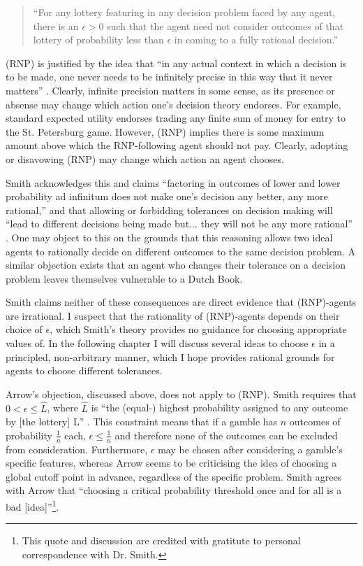 \documentclass{article}
\begin{document}
\begin{quote}
``For any lottery featuring in any decision problem faced by any agent, there is an \(\epsilon > 0\) such that the agent need not consider outcomes of that lottery of probability less than \(\epsilon\) in coming to a fully rational decision.''
\end{quote}

(RNP) is justified by the idea that ``in any actual context in which a decision is to be made, one never needs to be infinitely precise in this way \textemdash{} that it never matters'' \citep[pg. 474]{smith2014evaluative}. Clearly, infinite precision matters in some sense, as its presence or absense may change which action one's decision theory endorses. For example, standard expected utility endorses trading any finite sum of money for entry to the St. Petersburg game. However, (RNP) implies there is some maximum amount above which the RNP-following agent should not pay. Clearly, adopting or disavowing (RNP) may change which action an agent chooses.

Smith acknowledges this and claims ``factoring in outcomes of lower and lower probability ad infinitum does not make one’s decision any better, any more rational,'' and that allowing or forbidding tolerances on decision making will ``lead to different decisions being made \textemdash{} but... they will not be any more rational'' \citep[pg. 475]{smith2014evaluative}. One may object to this on the grounds that this reasoning allows two ideal agents to rationally decide on different outcomes to the same decision problem. A similar objection exists that an agent who changes their tolerance on a decision problem leaves themselves vulnerable to a Dutch Book. 

Smith claims neither of these consequences are direct evidence that (RNP)-agents are irrational. I suspect that the rationality of (RNP)-agents depends on their choice of \(\epsilon\), which Smith's theory provides no guidance for choosing appropriate values of. In the following chapter I will discuss several ideas to choose \(\epsilon\) in a principled, non-arbitrary manner, which I hope provides rational grounds for agents to choose different tolerances. 

Arrow's objection, discussed above, does not apply to (RNP). Smith requires that \(0 < \epsilon \leq \hat{L}\), where \(\hat{L}\) is ``the (equal-) highest probability assigned to any outcome by [the lottery] L'' \citep[pg. 479]{smith2014evaluative}. This constraint means that if a gamble has \(n\) outcomes of probability \(\frac{1}{n}\) each, \(\epsilon \leq \frac{1}{n}\) and therefore none of the outcomes can be excluded from consideration. Furthermore, \(\epsilon\) may be chosen after considering a gamble's specific features, whereas Arrow seems to be criticising the idea of choosing a global cutoff point in advance, regardless of the specific problem. Smith agrees with Arrow that ``choosing a critical probability threshold once and for all is a bad [idea]''\footnote{This quote and discussion are credited with gratitute to personal correspondence with Dr. Smith.}.
\end{document}
